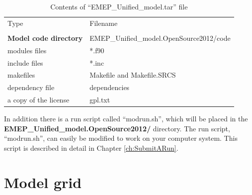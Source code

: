 \begin{table}[h]
\begin{center}
\caption{Contents of ``EMEP\_Unified\_model.tar'' file
   \label{Tab:modelfiles}}
\begin{tabular}{ll}
& \\
\hline
Type      & Filename          \\
\hline
& \\
{\bf Model code directory} & EMEP\_Unified\_model.OpenSource2012/code \\ 
\hline
modules files & *.f90 \\
include files & *.inc \\
makefiles & Makefile and Makefile.SRCS \\
dependency file &  dependencies\\
a copy of the license & gpl.txt \\
\hline
\end{tabular}
\end{center}
\end{table}





In addition there is a run script called ``modrun.sh'', which will be placed 
in the \\{\bf EMEP\_Unified\_model.OpenSource2012/}  directory. The run script, 
``modrun.sh'', can easily be modified to work on your computer system. This 
script is described in detail in Chapter \ref{ch:SubmitARun}. 
 




\section{Model grid}
\label{sec:ModelGrid}

